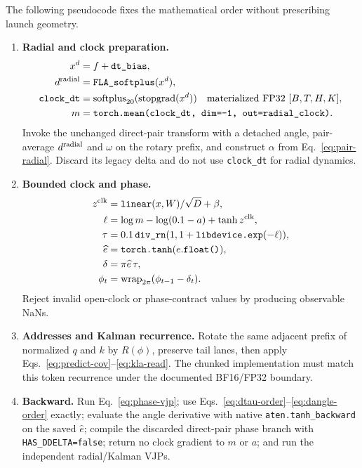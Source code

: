 \documentclass[11pt]{article}
\newcommand{\splus}{\operatorname{softplus}}
\newcommand{\detach}{\operatorname{stopgrad}}
\begin{document}
The following pseudocode fixes the mathematical order without prescribing launch geometry.
\begin{enumerate}[leftmargin=1.8em]
  \item \textbf{Radial and clock preparation.}
  \begin{align*}
    x^{d}&=f+\texttt{dt\_bias},\\
    d^{\rm radial}&=\texttt{FLA\_softplus}(x^d),\\
    \texttt{clock\_dt}&=\splus_{20}(\detach(x^d))\quad\text{materialized FP32 }[B,T,H,K],\\
    m&=\texttt{torch.mean(clock\_dt, dim=-1, out=radial\_clock)}.
  \end{align*}
  Invoke the unchanged direct-pair transform with a detached angle, pair-average
  $d^{\rm radial}$ and $\omega$ on the rotary prefix, and construct $\alpha$ from
  Eq.~\eqref{eq:pair-radial}.  Discard its legacy delta and do not use
  \texttt{clock\_dt} for radial dynamics.

  \item \textbf{Bounded clock and phase.}
  \begin{align*}
    z^{\rm clk}&=\texttt{linear}(x,W)/\sqrt D+\beta,\\
    \ell&=\log m-\log(0.1-a)+\tanh z^{\rm clk},\\
    \tau&=0.1\,\texttt{div\_rn}(1,1+\texttt{libdevice.exp}(-\ell)),\\
    \widehat e&=\texttt{torch.tanh}(e.\texttt{float()}),\\
    \delta&=\pi\widehat e\,\tau,\\
    \phi_t&=\operatorname{wrap}_{2\pi}(\phi_{t-1}-\delta_t).
  \end{align*}
  Reject invalid open-clock or phase-contract values by producing observable NaNs.

  \item \textbf{Addresses and Kalman recurrence.}
  Rotate the same adjacent prefix of normalized $q$ and $k$ by $R(\phi)$, preserve tail lanes,
  then apply Eqs.~\eqref{eq:predict-cov}--\eqref{eq:kla-read}.  The chunked implementation must
  match this token recurrence under the documented BF16/FP32 boundary.

  \item \textbf{Backward.}
  Run Eq.~\eqref{eq:phase-vjp}; use Eqs.~\eqref{eq:dtau-order}--\eqref{eq:dangle-order} exactly;
  evaluate the angle derivative with native \texttt{aten.tanh\_backward} on the saved
  $\widehat e$; compile the discarded direct-pair phase branch with
  \texttt{HAS\_DDELTA=false}; return no clock gradient to $m$ or $a$; and run the independent
  radial/Kalman VJPs.
\end{enumerate}
\end{document}

